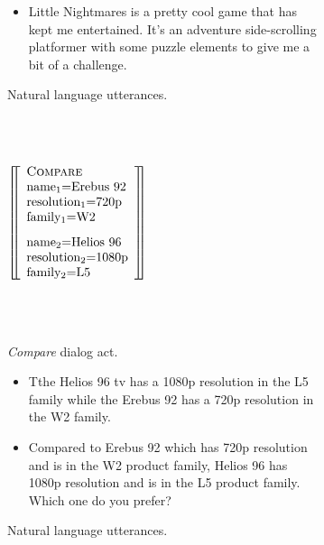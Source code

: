 \begin{figure}[p]
\begin{subfigure}{.58\textwidth}
\begin{itemize}
    \item Little Nightmares is a pretty cool game that has kept me entertained. It's an adventure side-scrolling platformer with some puzzle elements to give me a bit of a challenge.
\end{itemize}
\caption{Natural language utterances.}
\label{fig:mr1utt}
\end{subfigure}


~\\~\\


\begin{subfigure}{.35\textwidth}
\center
$\left[\!\!\left[\begin{array}{l} 
    \textsc{Compare} \\ 
    \textrm{name\textsubscript{1}=Erebus 92} \\
    \textrm{resolution\textsubscript{1}=720p} \\
    \textrm{family\textsubscript{1}=W2} \\[8pt]
    
    \textrm{name\textsubscript{2}=Helios 96} \\
    \textrm{resolution\textsubscript{2}=1080p} \\
    \textrm{family\textsubscript{2}=L5} \\
\end{array}\right]\!\!\right]$ 

~\\
~\\

\caption{\emph{Compare} dialog act.}\label{fig:compareexample}
\end{subfigure}\hfill \begin{subfigure}{.58\textwidth}
\begin{itemize}
    \item Tthe Helios 96 tv has a 1080p resolution in the L5 family while the Erebus 92 has a 720p resolution in the W2 family. 
    \item Compared to Erebus 92 which has 720p resolution and is in the W2 product family, Helios 96 has 1080p resolution and is in the L5 product family. Which one do you prefer?
\end{itemize}
\caption{Natural language utterances.}
\label{fig:mr1utt}
\end{subfigure}

~\\~\\

\begin{subfigure}{.35\textwidth}
\center


\end{subfigure}
\end{figure}
